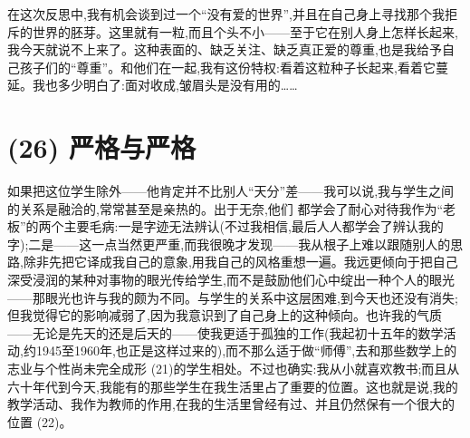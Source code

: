 在这次反思中,我有机会谈到过一个“没有爱的世界”,并且在自己身上寻找那个我拒斥的世界的胚芽。这里就有一粒,而且个头不小——至于它在别人身上怎样长起来,我今天就说不上来了。这种表面的、缺乏关注、缺乏真正爱的尊重,也是我给予自己孩子们的“尊重”。和他们在一起,我有这份特权:看着这粒种子长起来,看着它蔓延。我也多少明白了:面对收成,皱眉头是没有用的……

\section{(26) 严格与严格}

如果把这位学生除外——他肯定并不比别人“天分”差——我可以说,我与学生之间的关系是融洽的,常常甚至是亲热的。出于无奈,他们%
都学会了耐心对待我作为“老板”的两个主要毛病:一是字迹无法辨认(不过我相信,最后人人都学会了辨认我的字);二是——这一点当然更严重,而我很晚才发现——我从根子上难以跟随别人的思路,除非先把它译成我自己的意象,用我自己的风格重想一遍。我远更倾向于把自己深受浸润的某种对事物的眼光传给学生,而不是鼓励他们心中绽出一种个人的眼光——那眼光也许与我的颇为不同。与学生的关系中这层困难,到今天也还没有消失;但我觉得它的影响减弱了,因为我意识到了自己身上的这种倾向。也许我的气质——无论是先天的还是后天的——使我更适于孤独的工作(我起初十五年的数学活动,约1945至1960年,也正是这样过来的),而不那么适于做“师傅”,去和那些数学上的志业与个性尚未完全成形 (21)的学生相处。不过也确实:我从小就喜欢教书;而且从六十年代到今天,我能有的那些学生在我生活里占了重要的位置。这也就是说,我的教学活动、我作为教师的作用,在我的生活里曾经有过、并且仍然保有一个很大的位置 (22)。

